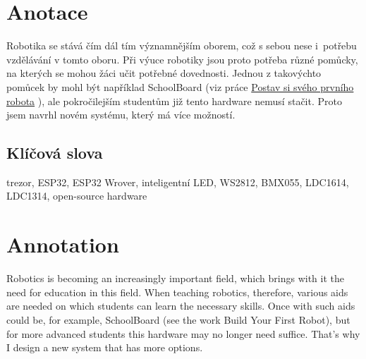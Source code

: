 \documentclass{template/socthesis}
\author{Tomáš Vavrinec} %
\begin{document}
\maketitle



\pagestyle{empty}

\section*{Anotace}
\color{black}

Robotika se stává čím dál tím významnějším oborem, což s sebou nese i~potřebu vzdělávání v tomto oboru.
Při výuce robotiky jsou proto potřeba různé pomůcky, na kterých se mohou žáci učit potřebné dovednosti. Jednou z takovýchto pomůcek 
by mohl být například SchoolBoard (viz práce \href{https://github.com/TVavrinec/SOC-text/blob/master/SOČ.pdf}{Postav si svého prvního robota} \parencite{soc2020}), 
ale pokročilejším studentům již tento hardware nemusí stačit. Proto jsem navrhl novém systému, který má více možností.

\subsection*{Klíčová slova}

\color{black}

trezor, ESP32, ESP32 Wrover, inteligentní LED, WS2812, BMX055, LDC1614, LDC1314, open-source hardware

\newpage

\vspace{20mm}

\section*{Annotation}
\color{black}

Robotics is becoming an increasingly important field, which brings with it the need for education in this field.
When teaching robotics, therefore, various aids are needed on which students can learn the necessary skills. Once with such aids
could be, for example, SchoolBoard (see the work Build Your First Robot), but for more advanced students this hardware may no 
longer need suffice. That's why I design a new system that has more options.
\end{document}
